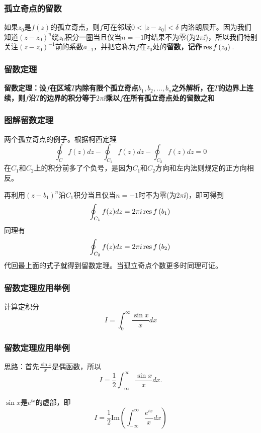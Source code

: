 \documentclass[CJK,13pt]{beamer}
\begin{document}
\begin{frame}
  \frametitle{孤立奇点的留数}
  
  如果$z_0$是$f(z)$的孤立奇点，则$f$可在邻域$0<|z-z_0|<\delta$ 内洛朗展开。因为我们知道$(z-z_0)^n$绕$z_0$积分一圈当且仅当$n= -1$时结果不为零(为$2 \pi\ii$)，所以我们特别关注$(z-z_0)^{-1}$前的系数$a_{-1}$，并把它称为$f$在$z_0$处的{\bf 留数，记作$\,\mathrm{res}\,f\left(z_0\right)\,$}.
  
\end{frame}


\begin{frame}
  \frametitle{留数定理}
  
      {\blue \bf 留数定理：设$f$在区域$T$内除有限个孤立奇点$b_1,b_2,\ldots,b_n$之外解析，在$T$的边界上连续，则$f$沿$T$的边界的积分等于$2\pi\ii$乘以$f$在所有孤立奇点处的留数之和}


  
\end{frame}

\begin{frame}
  \frametitle{图解留数定理}
  
  两个孤立奇点的例子。根据柯西定理
  $$\oint_C f(z) dz - \oint_{C_1}f(z)dz - \oint_{C_2}f(z) dz = 0$$
  {\scriptsize 在$C_1$和$C_2$上的积分前多了个负号，是因为$C_1$和$C_2$方向和左内法则规定的正方向相反。}  
  \emini
  \emini
  


  再利用$(z-b_1)^n$沿$C_1$积分当且仅当$n=-1$时不为零(为$2\pi\ii$)，即可得到
  $$\oint_{C_1}f(z)dz = 2\pi{\dot{\imath}} \,\mathrm{res}\,f\left(b_1\right)\,$$
  同理有
  $$\oint_{C_2}f(z)dz = 2\pi{\dot{\imath}} \,\mathrm{res}\,f\left(b_2\right)\,$$
  代回最上面的式子就得到留数定理。当孤立奇点个数更多时同理可证。 
  
\end{frame}

\begin{frame}
  \frametitle{留数定理应用举例}
  
  计算定积分
  $$I = \int_0^\infty \frac{\sin x}{x} dx $$
  
\end{frame}

\begin{frame}
  \frametitle{留数定理应用举例}
  
  思路：首先$\frac{\sin x}{x}$是偶函数，所以
  $$I = \frac{1}{2} \int_{-\infty}^\infty \frac{\sin x}{x} dx. $$

  $\sin x$是$e^{\ii x}$的虚部，即
  $$I = \frac{1}{2}\mathrm{Im} \left(\int_{-\infty}^\infty \frac{e^{ix}}{x} dx \right)$$
  
\end{frame}
\end{document}
